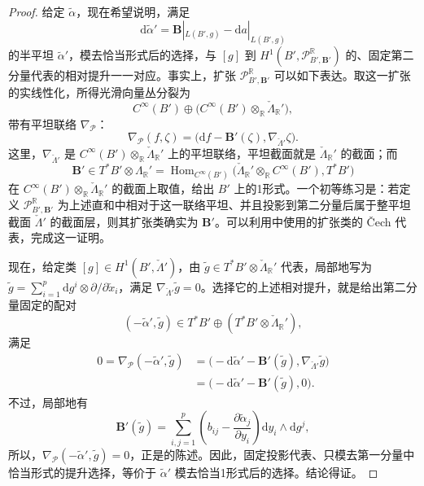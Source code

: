 \begin{proof}
给定 $\widetilde\alpha$，现在希望说明，满足
\begin{equation}\label{eq:6.5}
\mathrm d\widetilde\alpha'
=\mathbf B|_{L(B',g)}-\mathrm da|_{L(B',g)}
\end{equation}
的半平坦 $\widetilde\alpha'$，模去恰当形式后的选择，与 $[g]$ 到 $H^1(B',\mathcal P^{\mathbb R}_{B',\mathbf B'})$ 的、固定第二分量代表的相对提升一一对应。事实上，扩张 $\mathcal P^{\mathbb R}_{B',\mathbf B'}$ 可以如下表达。取这一扩张的实线性化，所得光滑向量丛分裂为
\[
C^\infty(B')\oplus
\bigl(C^\infty(B')\otimes_{\mathbb R}\check\Lambda_{\mathbb R}'\bigr),
\]
带有平坦联络 $\nabla_{\mathcal P}$：
\[
\nabla_{\mathcal P}(f,\zeta)
=\bigl(\mathrm df-\mathbf B'(\zeta),\nabla_{\check\Lambda'}\zeta\bigr).
\]
这里，$\nabla_{\check\Lambda'}$ 是 $C^\infty(B')\otimes_{\mathbb R}\check\Lambda_{\mathbb R}'$ 上的平坦联络，平坦截面就是 $\check\Lambda_{\mathbb R}'$ 的截面；而
\[
\mathbf B'\in T^*B'\otimes\Lambda_{\mathbb R}'
=\operatorname{Hom}_{C^\infty(B')}
\bigl(\check\Lambda_{\mathbb R}'\otimes_{\mathbb R}C^\infty(B'),T^*B'\bigr)
\]
在 $C^\infty(B')\otimes_{\mathbb R}\check\Lambda_{\mathbb R}'$ 的截面上取值，给出 $B'$ 上的1形式。一个初等练习是：若定义 $\mathcal P^{\mathbb R}_{B',\mathbf B'}$ 为上述直和中相对于这一联络平坦、并且投影到第二分量后属于整平坦截面 $\check\Lambda'$ 的截面层，则其扩张类确实为 $\mathbf B'$。可以利用中使用的扩张类的 Čech 代表，完成这一证明。

现在，给定类 $[g]\in H^1(B',\check\Lambda')$，由 $\widetilde g\in T^*B'\otimes\check\Lambda_{\mathbb R}'$ 代表，局部地写为 $\widetilde g=\sum_{i=1}^p\mathrm dg^i\otimes\partial/\partial\check x_i$，满足 $\nabla_{\check\Lambda'}\widetilde g=0$。选择它的上述相对提升，就是给出第二分量固定的配对
\[
(-\widetilde\alpha',\widetilde g)
\in T^*B'\oplus(T^*B'\otimes\check\Lambda_{\mathbb R}'),
\]
满足
\[
\begin{aligned}
0=\nabla_{\mathcal P}(-\widetilde\alpha',\widetilde g)
&=\bigl(-\mathrm d\widetilde\alpha'-\mathbf B'(\widetilde g),
\nabla_{\check\Lambda'}\widetilde g\bigr)\\
&=\bigl(-\mathrm d\widetilde\alpha'-\mathbf B'(\widetilde g),0\bigr).
\end{aligned}
\]
不过，局部地有
\[
\mathbf B'(\widetilde g)
=\sum_{i,j=1}^p
\left(b_{ij}-\frac{\partial\widetilde\alpha_j}{\partial y_i}\right)
\mathrm dy_i\wedge\mathrm dg^j,
\]
所以，$\nabla_{\mathcal P}(-\widetilde\alpha',\widetilde g)=0$，正是的陈述。因此，固定投影代表、只模去第一分量中恰当形式的提升选择，等价于 $\widetilde\alpha'$ 模去恰当1形式后的选择。结论得证。
\end{proof}

